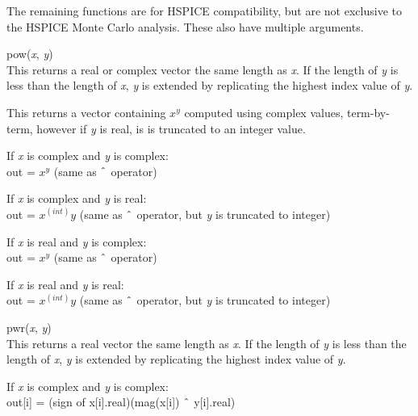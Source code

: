 The remaining functions are for HSPICE compatibility, but are not
exclusive to the HSPICE Monte Carlo analysis.  These also have
multiple arguments.

\begin{description}
\item{\vt pow}({\it x\/}, {\it y\/})\\
This returns a real or complex vector the same length as {\it x\/}. 
If the length of {\it y} is less than the length of {\it x\/}, {\it y}
is extended by replicating the highest index value of {\it y\/}.

This returns a vector containing $x^y$ computed using complex values,
term-by-term, however if {\it y} is real, is is truncated to an
integer value.

\begin{description}
\item{If {\it x} is complex and {\it y} is complex:}\\
  {\vt out =} $x^y$ (same as $\symbol{94}$ operator)

\item{If {\it x} is complex and {\it y} is real:}\\
  {\vt out =} $x^(int)y$ (same as $\symbol{94}$ operator, but {\it y}
    is truncated to integer)

\item{If {\it x} is real and {\it y} is complex:}\\
  {\vt out =} $x^y$ (same as $\symbol{94}$ operator)

\item{If {\it x} is real and {\it y} is real:}\\
  {\vt out =} $x^(int)y$ (same as $\symbol{94}$ operator, but {\it y}
    is truncated to integer)
\end{description}

\item{\vt pwr}({\it x\/}, {\it y\/})\\
This returns a real vector the same length as {\it x\/}.  If the
length of {\it y} is less than the length of {\it x\/}, {\it y} is
extended by replicating the highest index value of {\it y\/}.

\begin{description}
\item{If {\it x} is complex and {\it y} is complex:}\\
  {\vt out[i] =} (sign of {\vt x[i].real})({\vt mag(x[i])} $\symbol{94}$
  {\vt y[i].real})


\end{description}
\end{description}
